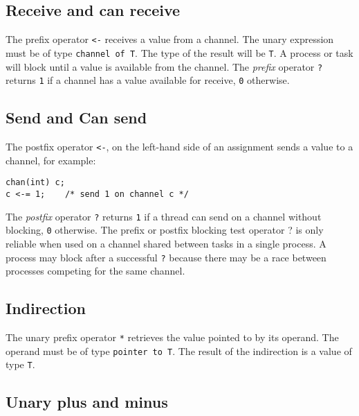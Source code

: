 \hypertarget{receive-and-can-receive}{%
\subsection{Receive and can receive}\label{receive-and-can-receive}}

The prefix operator \passthrough{\lstinline!<-!} receives a value from a
channel. The unary expression must be of type
\passthrough{\lstinline!channel of T!}. The type of the result will be
\passthrough{\lstinline!T!}. A process or task will block until a value
is available from the channel. The \emph{prefix} operator
\passthrough{\lstinline!?!} returns \passthrough{\lstinline!1!} if a
channel has a value available for receive, \passthrough{\lstinline!0!}
otherwise.

\hypertarget{send-and-can-send}{%
\subsection{Send and Can send}\label{send-and-can-send}}

The postfix operator \passthrough{\lstinline!<-!}, on the left-hand side
of an assignment sends a value to a channel, for example:

\begin{lstlisting}
chan(int) c;
c <-= 1;    /* send 1 on channel c */
\end{lstlisting}

The \emph{postfix} operator \passthrough{\lstinline!?!} returns
\passthrough{\lstinline!1!} if a thread can send on a channel without
blocking, \passthrough{\lstinline!0!} otherwise. The prefix or postfix
blocking test operator ? is only reliable when used on a channel shared
between tasks in a single process. A process may block after a
successful \passthrough{\lstinline!?!} because there may be a race
between processes competing for the same channel.

\hypertarget{indirection}{%
\subsection{Indirection}\label{indirection}}

The unary prefix operator \passthrough{\lstinline!*!} retrieves the
value pointed to by its operand. The operand must be of type
\passthrough{\lstinline!pointer to T!}. The result of the indirection is
a value of type \passthrough{\lstinline!T!}.

\hypertarget{unary-plus-and-minus}{%
\subsection{Unary plus and minus}\label{unary-plus-and-minus}}


